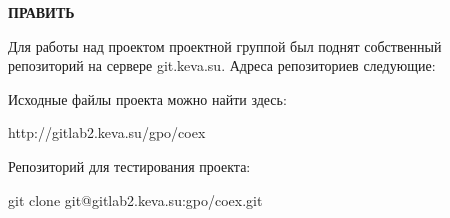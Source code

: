 

\textbf{ПРАВИТЬ}

Для работы над проектом проектной группой был поднят собственный репозиторий на сервере git.keva.su.
Адреса репозиториев следующие:

Исходные файлы проекта можно найти здесь:

http://gitlab2.keva.su/gpo/coex

Репозиторий для тестирования проекта:

git clone git@gitlab2.keva.su:gpo/coex.git
